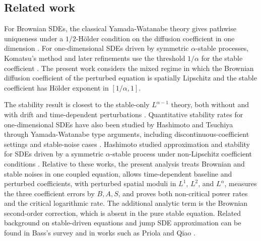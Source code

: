 \documentclass[11pt]{article}
\newcommand{\1}{\mathbf{1}}
\begin{document}
\subsection{Related work}
\label{subsec:related-work}

For Brownian SDEs, the classical Yamada-Watanabe theory gives pathwise uniqueness under a $1/2$-H\"older condition on the diffusion coefficient in one dimension \cite{YamadaWatanabe1971}. For one-dimensional SDEs driven by symmetric $\alpha$-stable processes, Komatsu's method and later refinements use the threshold $1/\alpha$ for the stable coefficient \cite{Komatsu1982,BassBurdzyChen2004,Fournier2013}. The present work considers the mixed regime in which the Brownian diffusion coefficient of the perturbed equation is spatially Lipschitz and the stable coefficient has H\"older exponent in $[1/\alpha,1]$.

The stability result is closest to the stable-only $L^{\alpha-1}$ theory, both without and with drift and time-dependent perturbations \cite{Nakagawa2020,Nakagawa2026}. Quantitative stability rates for one-dimensional SDEs have also been studied by Hashimoto and Tsuchiya through Yamada-Watanabe type arguments, including discontinuous-coefficient settings and stable-noise cases \cite{HashimotoTsuchiya2014}. Hashimoto studied approximation and stability for SDEs driven by a symmetric $\alpha$-stable process under non-Lipschitz coefficient conditions \cite{Hashimoto2013}. Relative to these works, the present analysis treats Brownian and stable noises in one coupled equation, allows time-dependent baseline and perturbed coefficients, with perturbed spatial moduli in $L^1$, $L^2$, and $L^\alpha$, measures the three coefficient errors by $B,A,S$, and proves both non-critical power rates and the critical logarithmic rate. The additional analytic term is the Brownian second-order correction, which is absent in the pure stable equation. Related background on stable-driven equations and jump SDE approximation can be found in Bass's survey and in works such as Priola and Qiao \cite{Bass2002,Priola2012,Qiao2014}.
\end{document}
